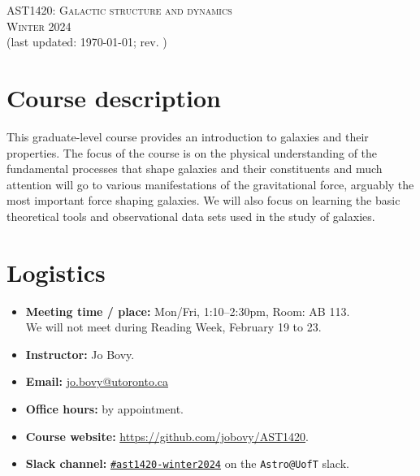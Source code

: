 \documentclass{article}
\begin{document}
\begin{center}
  \LARGE{\scshape{AST1420: Galactic structure and dynamics}}\\[5pt]
  \Large{\scshape{Winter 2024}}\\[5pt]
  \large{(last updated: \today; rev. \githash)}\\[25pt]
\end{center}

\section*{Course description}

This graduate-level course provides an introduction to galaxies and
their properties. The focus of the course is on the physical
understanding of the fundamental processes that shape galaxies and
their constituents and much attention will go to various
manifestations of the gravitational force, arguably the most important
force shaping galaxies. We will also focus on learning the basic
theoretical tools and observational data sets used in the study of
galaxies.

\section*{Logistics}

\begin{itemize}

  \item {\bf Meeting time / place:} Mon/Fri, 1:10--2:30pm, Room: AB
    113.\\[5pt] We will not meet during Reading Week, February 19 to 23.

  \item {\bf Instructor:} Jo Bovy.

  \item {\bf Email:} \href{mailto:jo.bovy@utoronto.ca}{jo.bovy@utoronto.ca}

  \item {\bf Office hours:} by appointment.

  \item {\bf Course website:} \url{https://github.com/jobovy/AST1420}.

  \item {\bf Slack channel:} \href{https://astro-uoft.slack.com/archives/C06CGEMV8G2}{\texttt{\#ast1420-winter2024}} on the \texttt{Astro@UofT} slack.

\end{itemize}
\end{document}
